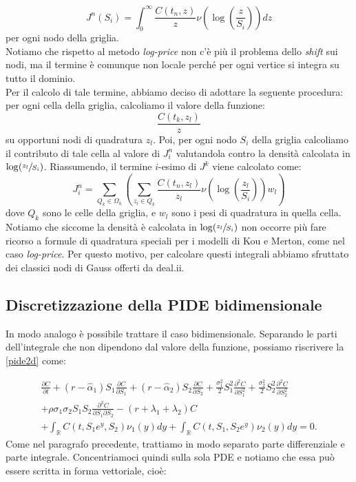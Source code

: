 \documentclass[a4paper,10pt]{report}
\newcommand{\der}[2]{\frac{\partial #1}{\partial #2}}
\newcommand{\dder}[2]{\frac{\partial^2 #1}{\partial #2^2}}
\newcommand{\dmix}[3]{\frac{\partial^2 #1}{\partial #2 \partial #3}}
\theoremstyle{plain}
\theoremstyle{definition}
\theoremstyle{remark}
\begin{document}
\begin{equation*}
 J^n(S_i)=\int_0^\infty \frac{C(t_n,z)}{z}\nu\left(\log\left(\frac{z}{S_i}\right) \right)dz
\end{equation*}
per ogni nodo della griglia.\\
Notiamo che rispetto al metodo \emph{log-price} non c'è più il problema dello \emph{shift} sui nodi, ma il termine è comunque non locale perché per ogni vertice si integra su tutto il dominio.\\
Per il calcolo di tale termine, abbiamo deciso di adottare la seguente procedura: per ogni cella della griglia, calcoliamo il valore della funzione: $$\frac{C(t_k,z_l)}{z}$$ su opportuni nodi di quadratura $z_l$. Poi, per ogni nodo $S_i$ della griglia calcoliamo il contributo di tale cella al valore di $J^n_i$ valutandola contro la densità calcolata in $\log(\sfrac{z_l}{S_i})$.
Riassumendo, il termine $i$-esimo di $J^k$ viene calcolato come:
\begin{equation*}
J^n_i=\sum\limits_{Q_k\in \Omega_h}\left( \sum\limits_{z_l\in Q_k}\frac{C(t_n,z_l)}{z_l}\nu\left(\log\left(\frac{z_l}{S_i}\right)\right)w_l\right)
\end{equation*}
dove $Q_k$ sono le celle della griglia, e $w_l$ sono i pesi di quadratura in quella cella. Notiamo che siccome la densità è calcolata in $\log(\sfrac{z_l}{S_i})$ non occorre pi\`u fare ricorso a formule di quadratura speciali per i modelli di Kou e Merton, come nel caso \emph{log-price}. Per questo motivo, per calcolare questi integrali abbiamo sfruttato dei classici nodi di Gauss offerti da \textsf{deal.ii}.

\subsection{Discretizzazione della PIDE bidimensionale}
In modo analogo è possibile trattare il caso bidimensionale. Separando le parti dell'integrale che non dipendono dal valore della funzione, possiamo riscrivere la \eqref{pide2d} come:

\begin{multline*}
 \der{C}{t}+(r-\hat{\alpha}_1)S_1\der{C}{S_1}+(r-\hat{\alpha}_2)S_2\der{C}{S_2}+\frac{\sigma^2_1}{2}S_1^2\dder{C}{S_1}+\frac{\sigma^2_2}{2}S_2^2\dder{C}{S_2}\\
 +\rho\sigma_1\sigma_2S_1S_2\dmix{C}{S_1}{S_2}-(r+\lambda_1+\lambda_2)C\\
 +\int_\mathbb{R}C(t,S_1e^y,S_2)\nu_1(y)dy+\int_\mathbb{R}C(t,S_1,S_2e^y)\nu_2(y)dy=0.
\end{multline*}
Come nel paragrafo precedente, trattiamo in modo separato parte differenziale e parte integrale. Concentriamoci quindi sulla sola PDE e notiamo che essa pu\`o essere scritta in forma vettoriale, cio\`e:
\end{document}
